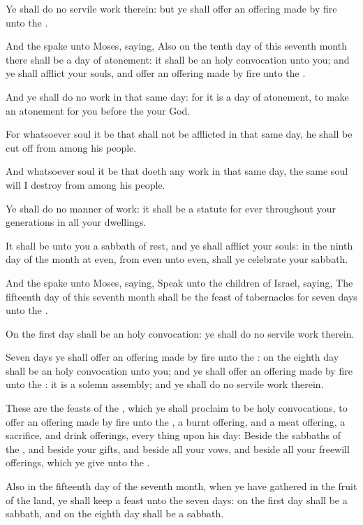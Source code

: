 \verse Ye shall do no servile work therein: but ye shall offer an offering made by fire unto the \LORD.

\verse And the \LORD spake unto Moses, saying, \verse Also on the tenth day of this seventh month there shall be a day of atonement: it shall be an holy convocation unto you; and ye shall afflict your souls, and offer an offering made by fire unto the \LORD.

\verse And ye shall do no work in that same day: for it is a day of atonement, to make an atonement for you before the \LORD your God.

\verse For whatsoever soul it be that shall not be afflicted in that same day, he shall be cut off from among his people.

\verse And whatsoever soul it be that doeth any work in that same day, the same soul will I destroy from among his people.

\verse Ye shall do no manner of work: it shall be a statute for ever throughout your generations in all your dwellings.

\verse It shall be unto you a sabbath of rest, and ye shall afflict your souls: in the ninth day of the month at even, from even unto even, shall ye celebrate your sabbath.

\verse And the \LORD spake unto Moses, saying, \verse Speak unto the children of Israel, saying, The fifteenth day of this seventh month shall be the feast of tabernacles for seven days unto the \LORD.

\verse On the first day shall be an holy convocation: ye shall do no servile work therein.

\verse Seven days ye shall offer an offering made by fire unto the \LORD: on the eighth day shall be an holy convocation unto you; and ye shall offer an offering made by fire unto the \LORD: it is a solemn assembly; and ye shall do no servile work therein.

\verse These are the feasts of the \LORD, which ye shall proclaim to be holy convocations, to offer an offering made by fire unto the \LORD, a burnt offering, and a meat offering, a sacrifice, and drink offerings, every thing upon his day: \verse Beside the sabbaths of the \LORD, and beside your gifts, and beside all your vows, and beside all your freewill offerings, which ye give unto the \LORD.

\verse Also in the fifteenth day of the seventh month, when ye have gathered in the fruit of the land, ye shall keep a feast unto the \LORD seven days: on the first day shall be a sabbath, and on the eighth day shall be a sabbath.


